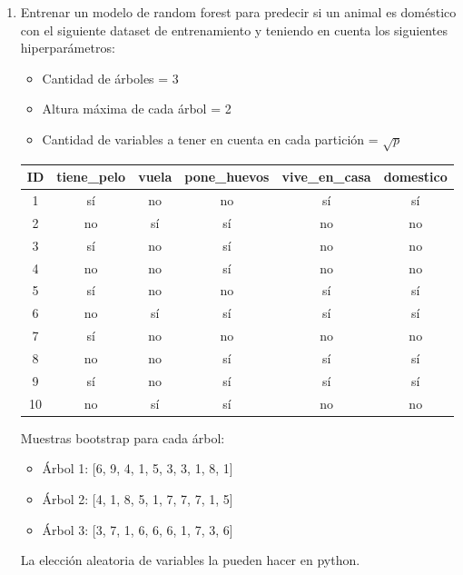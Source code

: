 \documentclass[12pt]{article}
\begin{document}
\begin{enumerate}
\begin{center}
    \end{center}

    \item Entrenar un modelo de random forest para predecir si un animal es doméstico con el siguiente dataset de entrenamiento y teniendo en cuenta los siguientes hiperparámetros:
    \begin{itemize}
        \item Cantidad de árboles = 3
        \item Altura máxima de cada árbol = 2
        \item Cantidad de variables a tener en cuenta en cada partición = \(\sqrt{p}\)
    \end{itemize}

    \begin{table}[H]
        \centering
        \begin{tabular}{cccccc}
            \toprule
            \textbf{ID} & \textbf{tiene\_pelo} & \textbf{vuela} & \textbf{pone\_huevos} & \textbf{vive\_en\_casa} & \textbf{domestico} \\
            \midrule
            1 & sí & no & no & sí & sí \\
            2 & no & sí & sí & no & no \\
            3 & sí & no & sí & no & no \\
            4 & no & no & sí & no & no \\
            5 & sí & no & no & sí & sí \\
            6 & no & sí & sí & sí & sí \\
            7 & sí & no & no & no & no \\
            8 & no & no & sí & sí & sí \\
            9 & sí & no & sí & sí & sí \\
            10 & no & sí & sí & no & no \\
            \bottomrule
        \end{tabular}
    \end{table}

    Muestras bootstrap para cada árbol:
    \begin{itemize}
        \item Árbol 1: [6, 9, 4, 1, 5, 3, 3, 1, 8, 1]
        \item Árbol 2: [4, 1, 8, 5, 1, 7, 7, 7, 1, 5]
        \item Árbol 3: [3, 7, 1, 6, 6, 6, 1, 7, 3, 6]
    \end{itemize}
    La elección aleatoria de variables la pueden hacer en python.

\end{enumerate}
\end{document}
